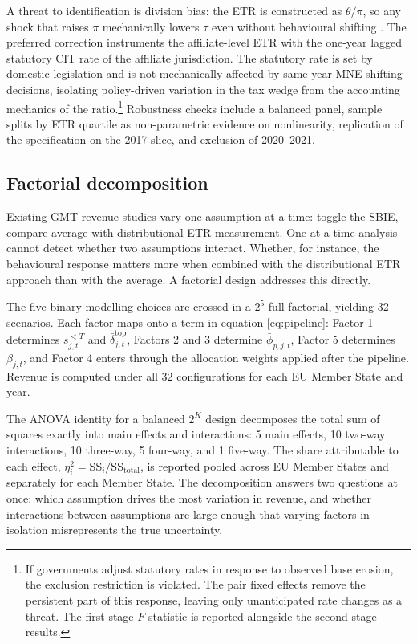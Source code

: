 \documentclass[11pt,a4paper]{article}
\begin{document}
A threat to identification is division bias: the ETR is constructed as $\theta/\pi$, so any shock that raises $\pi$ mechanically lowers $\tau$ even without behavioural shifting \citep{blouin2023}. The preferred correction instruments the affiliate-level ETR with the one-year lagged statutory CIT rate of the affiliate jurisdiction. The statutory rate is set by domestic legislation and is not mechanically affected by same-year MNE shifting decisions, isolating policy-driven variation in the tax wedge from the accounting mechanics of the ratio.\footnote{If governments adjust statutory rates in response to observed base erosion, the exclusion restriction is violated. The pair fixed effects remove the persistent part of this response, leaving only unanticipated rate changes as a threat. The first-stage $F$-statistic is reported alongside the second-stage results.} Robustness checks include a balanced panel, sample splits by ETR quartile as non-parametric evidence on nonlinearity, replication of the \citet{garcia-bernardo2024} specification on the 2017 slice, and exclusion of 2020--2021.

\subsection{Factorial decomposition}\label{sec:factorial}

Existing GMT revenue studies vary one assumption at a time: \citet{barake2022} toggle the SBIE, \citet{hugger2026} compare average with distributional ETR measurement. One-at-a-time analysis cannot detect whether two assumptions interact. Whether, for instance, the behavioural response matters more when combined with the distributional ETR approach than with the average. A factorial design addresses this directly.

The five binary modelling choices are crossed in a $2^5$ full factorial, yielding 32 scenarios. Each factor maps onto a term in equation \eqref{eq:pipeline}: Factor 1 determines $s_{j,t}^{<T}$ and $\bar{\delta}_{j,t}^{\text{top}}$, Factors 2 and 3 determine $\bar{\phi}_{p,j,t}$, Factor 5 determines $\beta_{j,t}$, and Factor 4 enters through the allocation weights applied after the pipeline. Revenue is computed under all 32 configurations for each EU Member State and year.

The ANOVA identity for a balanced $2^K$ design decomposes the total sum of squares exactly into main effects and interactions: 5 main effects, 10 two-way interactions, 10 three-way, 5 four-way, and 1 five-way. The share attributable to each effect, $\eta_i^2 = \text{SS}_i / \text{SS}_{\text{total}}$, is reported pooled across EU Member States and separately for each Member State. The decomposition answers two questions at once: which assumption drives the most variation in revenue, and whether interactions between assumptions are large enough that varying factors in isolation misrepresents the true uncertainty.
\end{document}
